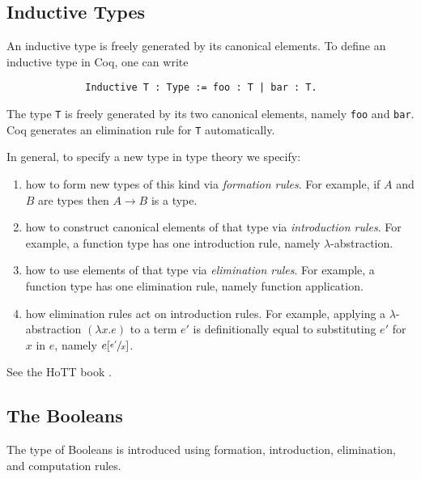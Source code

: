 \documentclass{amsart}
\theoremstyle{definition}
\begin{document}
\subsection{Inductive Types}
\label{sec:inductive-types}
An inductive type is freely generated by its canonical elements.
To define an inductive type in Coq, one can write
\begin{figure}[H]
    \centering
    \begin{verbatim}
        Inductive T : Type := foo : T | bar : T.
    \end{verbatim}
\end{figure}
The type \texttt{T} is freely generated by its two canonical elements, namely \texttt{foo} and \texttt{bar}.
Coq generates an elimination rule for \texttt{T} automatically.

In general, to specify a new type in type theory we specify:
\begin{enumerate}
    \item how to form new types of this kind via \emph{formation rules}.
    For example, if $A$ and $B$ are types then $A \to B$ is a type.
    \item how to construct canonical elements of that type via \emph{introduction rules}.
    For example, a function type has one introduction rule, namely $\lambda$-abstraction.
    \item how to use elements of that type via \emph{elimination rules}.
    For example, a function type has one elimination rule, namely function application.
    \item how elimination rules act on introduction rules.
    For example, applying a $\lambda$-abstraction $(\lambda x.e)$ to a term $e'$ is definitionally equal to substituting $e'$ for $x$ in $e$, namely $e[\sfrac{e'}{x}]$. 
\end{enumerate}
See the HoTT book \cite{hottbook}.

\subsection{The Booleans}
\label{sec:the-booleans}

The type of Booleans is introduced using formation, introduction, elimination, and computation rules. 
\end{document}
